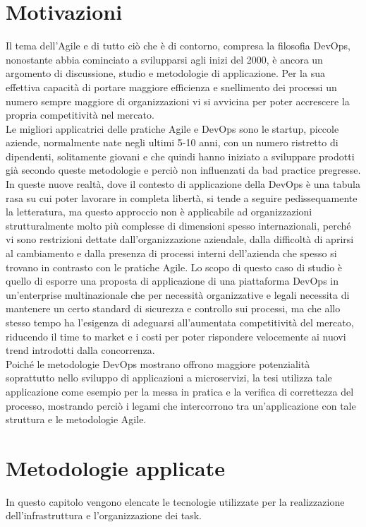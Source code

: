 \documentclass[a4paper, 12pt]{report}
\numberwithin{equation}{section}
\begin{document}
\chapter{Motivazioni}\label{motivazioni}
Il tema dell’Agile e di tutto ciò che è di contorno, compresa la filosofia DevOps, nonostante abbia cominciato a svilupparsi agli inizi del 2000, è ancora un argomento di discussione, studio e metodologie di applicazione. Per la sua effettiva capacità di portare maggiore efficienza e snellimento dei processi un numero sempre maggiore di organizzazioni vi si avvicina per poter accrescere la propria competitività nel mercato.\\
Le migliori applicatrici delle pratiche Agile e DevOps sono le startup, piccole aziende, normalmente nate negli ultimi 5-10 anni, con un numero ristretto di dipendenti, solitamente giovani e che quindi hanno iniziato a sviluppare prodotti già secondo queste metodologie e perciò non influenzati da bad practice pregresse.\\
In queste nuove realtà, dove il contesto di applicazione della DevOps è una tabula rasa su cui poter lavorare in completa libertà, si tende a seguire pedissequamente la letteratura, ma questo approccio non è applicabile ad organizzazioni strutturalmente molto più complesse di dimensioni spesso internazionali, perché vi sono restrizioni dettate dall’organizzazione aziendale, dalla difficoltà di aprirsi al cambiamento e dalla presenza di processi interni dell’azienda che spesso si trovano in contrasto con le pratiche Agile.
Lo scopo di questo caso di studio è quello di esporre una proposta di applicazione di una piattaforma DevOps in un’enterprise multinazionale che per necessità organizzative e legali necessita di mantenere un certo standard di sicurezza e controllo sui processi, ma che allo stesso tempo ha l'esigenza di adeguarsi all’aumentata competitività del mercato, riducendo il time to market e i costi per poter rispondere velocemente ai nuovi trend introdotti dalla concorrenza.\\
Poiché le metodologie DevOps mostrano offrono maggiore potenzialità soprattutto nello sviluppo di 
applicazioni a microservizi, la tesi utilizza tale applicazione come esempio per la messa
in pratica e la verifica di correttezza del processo, mostrando perciò i legami che
intercorrono tra un'applicazione con tale struttura e le metodologie Agile.


\chapter{Metodologie applicate}\label{metodologie}
In questo capitolo vengono elencate le tecnologie utilizzate per la realizzazione dell’infrastruttura e l’organizzazione dei task. 
\end{document}
